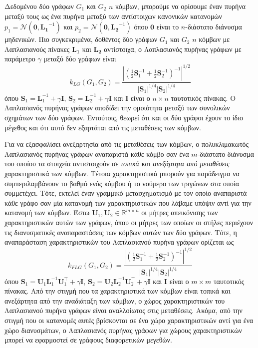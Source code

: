 Δεδομένου δύο γράφων $G_1$ και $G_2$ $n$ κόμβων, μπορούμε να ορίσουμε έναν πυρήνα μεταξύ τους ως ένα πυρήνα μεταξύ των αντίστοιχων κανονικών κατανομών $p_1 = \mathcal{N}(\mathbf{0}, \mathbf{L_1}^{-1})$ και $p_2 = \mathcal{N}(\mathbf{0}, \mathbf{L_2}^{-1})$ όπου $\mathbf{0}$ είναι το $n$-διάστατο διάνυσμα μηδενικών.
Πιο συγκεκριμένα, δοθέντος δύο γράφων $G_1$ και $G_2$ $n$ κόμβων με Λαπλασιανούς πίνακες $\mathbf{L_1}$ και $\mathbf{L_2}$ αντίστοιχα, ο Λαπλασιανός πυρήνας γράφων με παράμετρο $\gamma$ μεταξύ δύο γράφων είναι
\begin{equation*}
    k_{LG}(G_1, G_2) = \frac{| (\frac{1}{2} \mathbf{S}_1^{-1} + \frac{1}{2} \mathbf{S}_2^{-1} )^{-1} |^{1/2}}{|\mathbf{S}_1|^{1/4} |\mathbf{S}_2|^{1/4}} 
\end{equation*}όπου $\mathbf{S}_1 = \mathbf{L}_1^{-1} + \gamma \mathbf{I}$, $\mathbf{S}_2 = \mathbf{L}_2^{-1} + \gamma \mathbf{I}$ και
$\mathbf{I}$ είναι ο $n \times n$ ταυτοτικός πίνακας.
Ο Λαπλασιανός πυρήνας γράφων αποδίδει την ομοιότητα μεταξύ των συνολικών σχημάτων των δύο γράφων.
Εντούτοις, θεωρεί ότι και οι δύο γράφοι έχουν το ίδιο μέγεθος και ότι αυτό δεν εξαρτάται από τις μεταθέσεις των κόμβων.\par
Για να εξασφαλίσει ανεξαρτησία από τις μεταθέσεις των κόμβων, ο πολυκλιμακωτός Λαπλασιανός πυρήνας γράφων αναπαριστά κάθε κόμβο σαν ένα $m$-διάστατο διάνυσμα του οποίου τα στοιχεία αντιστοιχούν σε \textit{τοπικά} και \textit{ανεξάρτητα από μεταθέσεις} χαρακτηριστικά των κόμβων.
Τέτοια χαρακτηριστικά μπορούν για παράδειγμα να συμπεριλαμβάνουν το βαθμό ενός κόμβου ή το νούμερο των τριγώνων στα οποία συμμετέχει.
Τότε, εκτελεί έναν γραμμικό μετασχηματισμό με τον οποίο αναπαριστά κάθε γράφο σαν μία κατανομή των χαρακτηριστικών που λάβαμε υπόψιν αντί για την κατανομή των κόμβων.
Έστω $\mathbf{U}_1, \mathbf{U}_2 \in \mathbb{R}^{m \times n}$ οι μήτρες απεικόνισης των χαρακτηριστικών αυτών των γράφων, όπου οι μήτρες των οποίων οι στήλες περιέχουν τις διανυσματικές αναπαραστάσεις των κόμβων αυτών των δύο γράφων. 
Τότε, η αναπαράσταση χαρακτηριστικών του Λαπλασιανού πυρήνα γράφων ορίζεται ως
\begin{equation*}
    k_{FLG}(G_1, G_2) = \frac{| (\frac{1}{2} \mathbf{S}_1^{-1} + \frac{1}{2} \mathbf{S}_2^{-1} )^{-1} |^{1/2}}{|\mathbf{S}_1|^{1/4} |\mathbf{S}_2|^{1/4}} 
\end{equation*}
όπου $\mathbf{S}_1 = \mathbf{U}_1 \mathbf{L}_1^{-1} \mathbf{U}_1^\top + \gamma \mathbf{I}$, $\mathbf{S}_2 = \mathbf{U}_2 \mathbf{L}_2^{-1} \mathbf{U}_2^\top + \gamma \mathbf{I}$ και $\mathbf{I}$ είναι ο $m \times m$ ταυτοτικός πίνακας.
Από την στιγμή που τα χαρακτηριστικά των κόμβων είναι τοπικά και ανεξάρτητα από την αναδιάταξη των κόμβων, ο χώρος χαρακτηριστικών του Λαπλασιανού πυρήνα γράφων είναι αναλλοίωτος στις μεταθέσεις.
Ακόμα, από την στιγμή που οι κατανομές αυτές βρίσκονται σε ένα χώρο χαρακτηριστικών αντί για ένα χώρο διανυσμάτων, ο Λαπλασιανός πυρήνας γράφων για χώρους χαρακτηριστικών μπορεί να εφαρμοστεί σε γράφους διαφορετικών μεγεθών.

